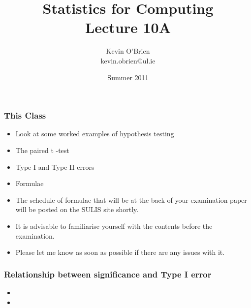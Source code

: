 ﻿\documentclass[a4]{beamer}
\title[MA4413t]{Statistics for Computing \\ {\normalsize Lecture 10A}}
\author[Kevin O'Brien]{Kevin O'Brien \\ {\scriptsize kevin.obrien@ul.ie}}
\date{Summer 2011}
\institute[Maths \& Stats]{Dept. of Mathematics \& Statistics, \\ University \textit{of} Limerick}
\begin{document}
\begin{frame}
\frametitle{This Class}
\begin{itemize}
\item Look at some worked examples of hypothesis testing
\item The paired t -test
\item Type I and Type II errors
\item Formulae
\end{itemize}
\end{frame}
\begin{frame}
\begin{itemize}
\item The schedule of formulae that will be at the back of your examination paper will be posted on the SULIS site shortly.
\item It is advisable to familiarise yourself with the contents before the examination.
\item Please let me know as soon as possible if there are any issues with it.
\end{itemize}
\end{frame}



\begin{frame}
\frametitle{Relationship between significance and Type I error}
\begin{itemize}
\item
\item
\end{itemize}
\end{frame}
\end{document}

